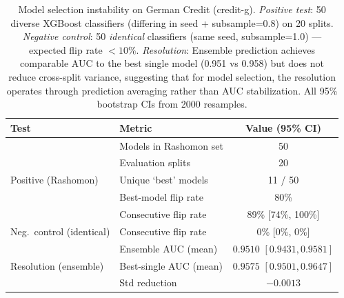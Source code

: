 \begin{table}[ht]
\centering
\caption{Model selection instability on German Credit (credit-g).
  \emph{Positive test}: 50 diverse XGBoost classifiers (differing in seed + subsample=0.8) on 20 splits.
  \emph{Negative control}: 50 \emph{identical} classifiers (same seed, subsample=1.0) --- expected flip rate $<10\%$.
  \emph{Resolution}: Ensemble prediction achieves comparable AUC to the best single model (0.951 vs 0.958) but does not reduce cross-split variance, suggesting that for model selection, the resolution operates through prediction averaging rather than AUC stabilization.
  All 95\% bootstrap CIs from 2000 resamples.}
\label{tab:model_selection_instability}
\begin{tabular}{llc}
\toprule
\textbf{Test} & \textbf{Metric} & \textbf{Value (95\% CI)} \\
\midrule
\multirow{5}{*}{Positive (Rashomon)} & Models in Rashomon set & 50 \\
& Evaluation splits & 20 \\
& Unique `best' models & 11 / 50 \\
& Best-model flip rate & 80\% \\
& Consecutive flip rate & 89\% [74\%, 100\%] \\
\midrule
Neg.\ control (identical) & Consecutive flip rate & 0\% [0\%, 0\%] \\
\midrule
\multirow{3}{*}{Resolution (ensemble)} & Ensemble AUC (mean) & $0.9510$ $[0.9431, 0.9581]$ \\
& Best-single AUC (mean) & $0.9575$ $[0.9501, 0.9647]$ \\
& Std reduction & $-0.0013$ \\
\bottomrule
\end{tabular}
\end{table}
